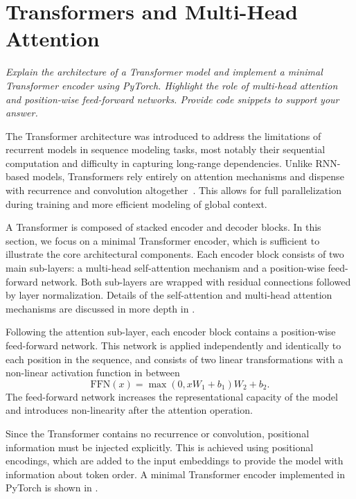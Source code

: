 \section{Transformers and Multi-Head Attention}
\textit{Explain the architecture of a Transformer model and implement a minimal
Transformer encoder using PyTorch. Highlight the role of multi-head attention and
position-wise feed-forward networks. Provide code snippets to support your
answer.}

The Transformer architecture was introduced to address the
limitations of recurrent models in sequence modeling tasks,
most notably their sequential computation and difficulty
in capturing long-range dependencies.
Unlike RNN-based models, Transformers rely entirely on
attention mechanisms and dispense with recurrence and
convolution altogether~\cite{vaswaniAttentionAllYou2017}.
This allows for full parallelization during training and
more efficient modeling of global context.

A Transformer is composed of stacked encoder and decoder
blocks.
In this section, we focus on a minimal Transformer encoder,
which is sufficient to illustrate the core architectural
components.
Each encoder block consists of two main sub-layers:
a multi-head self-attention mechanism and a position-wise
feed-forward network.
Both sub-layers are wrapped with residual connections
followed by layer normalization.
Details of the self-attention and multi-head attention
mechanisms are discussed in more depth in
.

Following the attention sub-layer, each encoder block
contains a position-wise feed-forward network.
This network is applied independently and identically
to each position in the sequence, and consists of two
linear transformations with a non-linear activation
function in between
\begin{equation}
\text{FFN}(x) = \max(0, xW_1 + b_1)W_2 + b_2.
\end{equation}
The feed-forward network increases the representational
capacity of the model and introduces non-linearity
after the attention operation.

Since the Transformer contains no recurrence or convolution,
positional information must be injected explicitly.
This is achieved using positional encodings, which are added
to the input embeddings to provide the model with information
about token order.
A minimal Transformer encoder implemented in PyTorch is
shown in .

